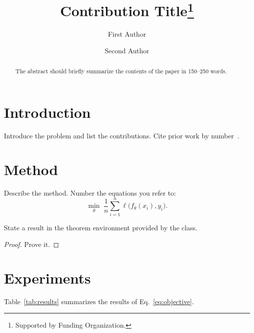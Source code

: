 \documentclass[runningheads]{llncs}
\begin{document}
\title{Contribution Title\thanks{Supported by Funding Organization.}}

\author{First Author \and Second Author}



\maketitle

\begin{abstract}
The abstract should briefly summarize the contents of the paper in
150--250 words.

\end{abstract}

\section{Introduction}
Introduce the problem and list the contributions. Cite prior work by
number~\cite{lamport1994latex,knuth1984texbook}.

\section{Method}
Describe the method. Number the equations you refer to:
\begin{equation}
  \label{eq:objective}
  \min_{\theta} \; \frac{1}{n} \sum_{i=1}^{n} \ell\bigl(f_\theta(x_i), y_i\bigr) .
\end{equation}

\begin{theorem}
State a result in the theorem environment provided by the class.
\end{theorem}

\begin{proof}
Prove it.
\end{proof}

\section{Experiments}
Table~\ref{tab:results} summarizes the results of Eq.~\eqref{eq:objective}.
\end{document}
